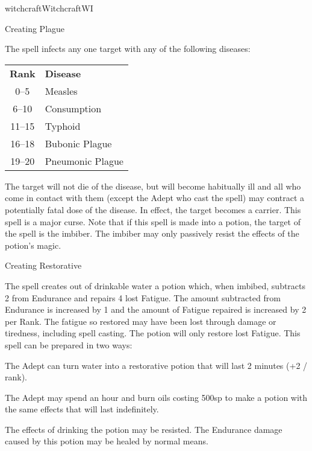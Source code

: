 \begin{college}[1.1]{witchcraft}{Witchcraft}{WI}
\begin{spell}[S-8]{Creating Plague}

\begin{effects}
The spell infects any one target with any of the following diseases:

\begin{tabular}{cl}
\textbf{Rank} & \textbf{Disease} \\
0--5	& Measles \\
6--10	& Consumption \\
11--15	& Typhoid \\
16--18	& Bubonic Plague \\
19--20	& Pneumonic Plague \\
\end{tabular}

The target will not die of the disease, but will become habitually ill
and all who come in contact with them (except the Adept who cast the
spell) may contract a potentially fatal dose of the disease.  In
effect, the target becomes a carrier. This spell is a major curse.
Note that if this spell is made into a potion, the target of the spell
is the imbiber.  The imbiber may only passively resist the effects of
the potion's magic.
\end{effects}
\end{spell}

\begin{spell}[S-9]{Creating Restorative}

\begin{effects}
The spell creates out of drinkable water a potion which, when imbibed,
subtracts 2 from Endurance and repairs 4 lost Fatigue.  The amount
subtracted from Endurance is increased by 1 and the amount of Fatigue
repaired is increased by 2 per Rank.  The fatigue so restored may have
been lost through damage or tiredness, including spell casting.  The
potion will only restore lost Fatigue.  This spell can be prepared in
two ways:
\begin{Enumerate}
\item
The Adept can turn water into a restorative potion that will last 2
minutes (+2 / rank).
\item
The Adept may spend an hour and burn oils costing 500sp to make a
potion with the same effects that will last indefinitely.
\end{Enumerate}
The effects of drinking the potion may be resisted.  The Endurance
damage caused by this potion may be healed by normal means.
\end{effects}
\end{spell}


\end{college}
